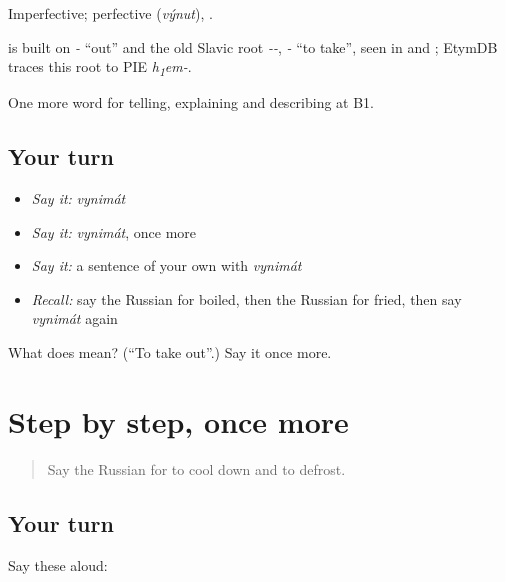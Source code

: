 Imperfective; perfective \emph{} (\emph{výnut}), \emph{}.

\begin{cousinweb}
\emph{} is built on \emph{-} \textquotedblleft{}out\textquotedblright{} and the old Slavic root \emph{--}, \emph{-} \textquotedblleft{}to take\textquotedblright{}, seen in \emph{} and \emph{}; EtymDB traces this root to PIE \emph{h\textsubscript{1}em-}.
\end{cousinweb}

\begin{grammarlens}[title={What you've built}]
One more word for telling, explaining and describing at B1.
\end{grammarlens}

\subsection*{Your turn}
\begin{itemize}
\raggedright
  \item \emph{Say it:} \emph{vynimát}
  \item \emph{Say it:} \emph{vynimát}, once more
  \item \emph{Say it:} a sentence of your own with \emph{vynimát}
  \item \emph{Recall:} say the Russian for boiled, then the Russian for fried, then say \emph{vynimát} again
\end{itemize}

\begin{tcolorbox}[breakable,colback=teal!4,colframe=teal!35!black,title={Before you move on}]
What does  mean? (\textquotedblleft{}To take out\textquotedblright{}.) Say it once more.
\end{tcolorbox}
\section[(dialogue)]{Step by step, once more}

\label{lesson:RU-R336-review-335-336}



\begin{quote}
Say the Russian for to cool down and to defrost.
\end{quote}

\subsection*{Your turn}
Say these aloud:

